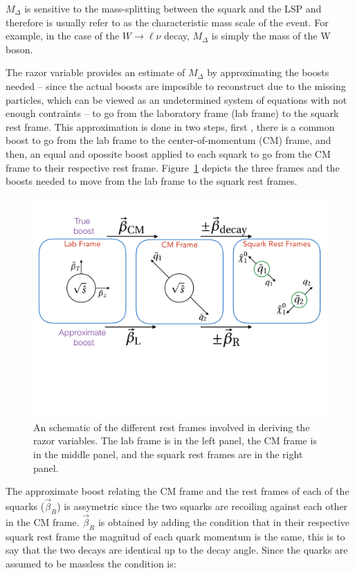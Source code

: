$M_{\Delta}$ is sensitive to the mass-splitting between the squark and
the LSP  and therefore is usually refer to as the characteristic mass
scale of the event. For example, in the case of the $W\rightarrow
\ell\nu$ decay, $M_{\Delta}$ is simply the mass of the W boson.

The razor variable \MR provides an estimate of $M_{\Delta}$ by
approximating the boosts needed -- since the actual boosts are
imposible to reconstruct due to the missing particles, which can be
viewed as an undetermined system of equations with not enough
contraints -- to go from the laboratory frame (lab frame) to the
squark rest frame. This approximation is done in two steps, first
, there is a common boost to go from the lab frame to the
center-of-momentum (CM) frame, and then, an equal and opossite boost
applied to each squark to go from the CM frame to their respective
rest frame. Figure~\ref{fig:restFrames} depicts the three frames and
the boosts needed to move from the lab frame to the squark rest frames.
\begin{figure}
 \centering
\includegraphics[width=1.0\textwidth]{RazorVariables/RazorFrameDiagram.pdf}
 \caption{An schematic of the  different rest frames involved in
   deriving the razor variables. The lab frame is in the left panel,
   the CM frame is in the middle panel, and the  squark rest frames
   are in the right panel.\label{fig:restFrames}}
\end{figure}  

The approximate boost relating the CM frame and the rest frames of each of the
squarks ($\vec{\beta}_{R}$) is assymetric since the two squarks are recoiling against each
other in the CM frame. $\vec{\beta}_{R}$ is obtained by adding the condition
that in their respective squark rest frame the magnitud of each quark
momentum is the same, this is to say that the two decays are identical
up to the decay angle. Since the quarks are assumed to be massless
the condition is:

